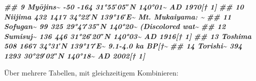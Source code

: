 \documentclass[
  ngerman,
]{article}
\newenvironment{Shaded}{\begin{snugshade}}{\end{snugshade}}
\newcommand{\DocumentationTok}[1]{\textcolor[rgb]{0.56,0.35,0.01}{\textbf{\textit{#1}}}}
\begin{document}
\begin{Shaded}
\begin{Highlighting}[]
\DocumentationTok{\#\#  9 Myōjins\textasciitilde{} {-}50             {-}164             31°55′05″N 140°01\textasciitilde{} AD 1970[† 1]    }
\DocumentationTok{\#\# 10 Niijima  432             1417             34°22′N 139°16′E﻿\textasciitilde{}  Mt. Mukaiyama: \textasciitilde{}}
\DocumentationTok{\#\# 11 Sofugan\textasciitilde{} 99              325              29°47′35″N 140°20\textasciitilde{} (Discolored wat\textasciitilde{}}
\DocumentationTok{\#\# 12 Sumisuj\textasciitilde{} 136             446              31°26′20″N 140°03\textasciitilde{} AD 1916[† 1]    }
\DocumentationTok{\#\# 13 Toshima  508             1667             34°31′N 139°17′E﻿\textasciitilde{}  9.1{-}4.0 ka BP[†\textasciitilde{}}
\DocumentationTok{\#\# 14 Torishi\textasciitilde{} 394             1293             30°29′02″N 140°18\textasciitilde{} AD 2002[† 1]}
\end{Highlighting}
\end{Shaded}

Über mehrere Tabellen, mit gleichzeitigem Kombinieren:
\end{document}
